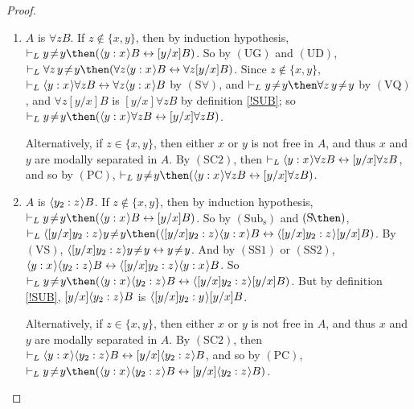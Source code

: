 \documentclass[11pt]{woarticle}
\theoremstyle{break}
\theoremstyle{nonumberplain}
\newcommand{\1}{\;\,|\;\,}
\renewcommand{\t}[1]{\ensuremath{\langle #1  \makebox[.2ex]{}\rangle}}
\newcommand{\T}[1]{\ensuremath{(\mathrm{ #1})}}
\begin{document}
\begin{proof}
\begin{enumerate}
  \item $A$ is $\forall z B$. If $z \not\in \{x,y\}$, then by
    induction hypothesis, $\vdash_{L} y\!\not=\!y \then (\t{y:x}B
    \leftrightarrow [y/x]B)$. So by \T{UG} and \T{UD}, $\vdash_{L}
    \forall z \, y\!\not=\!y \then (\forall z\t{y:x}B \leftrightarrow
    \forall z[y/x]B)$. Since $z\not\in \{x,y\}$, $\vdash_{L}
    \t{y:x}\forall z B \leftrightarrow \forall z \t{y:x}B$ by
    \T{S\forall}, and $\vdash_L y\!\not=\!y \then \forall z\,
    y\!\not=\!y$ by \T{VQ}, and $\forall z[y/x]B$ is $[y/x]\forall zB$
    by definition \ref{!SUB}; so $\vdash_{L} y\!\not=\!y \then
    (\t{y:x}\forall zB \leftrightarrow [y/x]\forall zB)$.

    Alternatively, if $z \in \{x,y\}$, then either $x$ or $y$ is not
    free in $A$, and thus $x$ and $y$ are modally separated in $A$.
    By \T{SC2}, then $\vdash_L \t{y:x}\forall z B \leftrightarrow
    [y/x]\forall z B$, and so by \T{PC}, $\vdash_L y\!\not=\!y \then
    (\t{y:x}\forall z B \leftrightarrow [y/x]\forall z B)$.

  \item $A$ is $\t{y_2:z}B$.\; If $z \not\in \{x,y\}$, then by
    induction hypothesis, $\vdash_L y\!\not=\!y \then (\t{y:x}B
    \leftrightarrow [y/x]B)$. So by \T{Sub_s} and \T{S\!\then},
    $\vdash_L \t{[y/x]y_2:z}y\!\not=\!y \then (\t{[y/x]y_2:z}\t{y:x}B
    \leftrightarrow \t{[y/x]y_2:z}[y/x]B)$. By \T{VS},
    $\t{[y/x]y_2:z}y\!\not=\!y \leftrightarrow y\!\not=\!y$. And by
    \T{SS1} or \T{SS2}, $\t{y:x}\t{y_2:z}B \leftrightarrow
    \t{[y/x]y_2:z}\t{y:x}B$. So $\vdash_L y\!\not=\!y \then
    (\t{y:x}\t{y_2:z}B \leftrightarrow \t{[y/x]y_2:z}[y/x]B)$. But by
    definition \ref{!SUB}, $[y/x]\t{y_2:z} B$ is
    $\t{[y/x]y_2:y}[y/x]B$.

    Alternatively, if $z \in \{x,y\}$, then either $x$ or $y$ is not
    free in $A$, and thus $x$ and $y$ are modally separated in $A$.
    By \T{SC2}, then $\vdash_L \t{y:x}\t{y_2:z} B \leftrightarrow
    [y/x]\t{y_2:z} B$, and so by \T{PC}, $\vdash_L y\!\not=\!y \then
    (\t{y:x}\t{y_2:z} B \leftrightarrow [y/x]\t{y_2:z} B)$.


\end{enumerate}
\end{proof}
\end{document}
